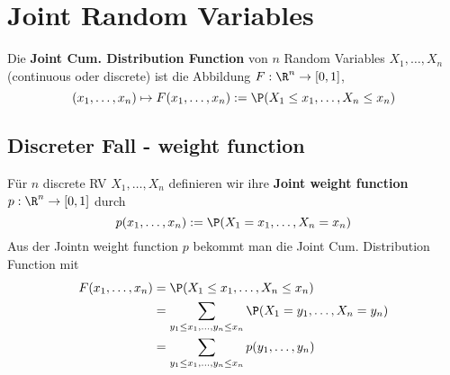 \section{Joint Random Variables}
\begin{mainbox}{}
    Die \textbf{Joint Cum. Distribution Function} von $n$ Random Variables $X_1, \ldots, X_n$ (continuous oder discrete) ist die Abbildung $F: \R^n \to [0,1]$,
    $$(x_1, \ldots, x_n) \mapsto F(x_1, \ldots, x_n) := \P(X_1 \leq x_1, \ldots, X_n \leq x_n)$$
\end{mainbox}
\subsection{Discreter Fall - weight function}
    Für $n$ discrete RV $X_1, \ldots, X_n$ definieren wir ihre \textbf{Joint weight function} $p: \R^n \to [0,1]$ durch
    $$p(x_1, \ldots, x_n) := \P(X_1 = x_1, \ldots, X_n = x_n)$$
    Aus der Jointn weight function $p$ bekommt man die Joint Cum. Distribution Function mit
    \begin{align*}
        F(x_1, \ldots, x_n) &= \P(X_1 \leq x_1, \ldots, X_n \leq x_n)\\
        &= \sum_{y_1 \leq x_1, \ldots, y_n \leq x_n}\P(X_1 = y_1, \ldots, X_n = y_n)\\
        &= \sum_{y_1 \leq x_1, \ldots, y_n \leq x_n}p(y_1, \ldots,y_n)
    \end{align*}    

